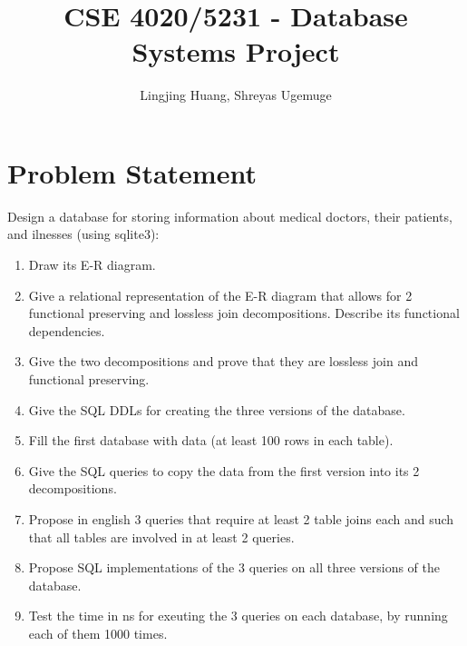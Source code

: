 \documentclass[12pt,arial]{article}
\title{CSE 4020/5231 - Database Systems Project}
\author{Lingjing Huang, Shreyas Ugemuge}
\begin{document}
\maketitle
\tableofcontents
\pagebreak
\section*{Problem Statement}
Design a database for storing information about medical doctors, their patients, and ilnesses (using sqlite3):
\begin{enumerate}
	\item Draw its E-R diagram.
	\item Give a relational representation of the E-R diagram that allows for 2 functional preserving and lossless join decompositions. Describe its functional dependencies.
	\item Give the two decompositions and prove that they are lossless join and functional preserving.
	\item Give the SQL DDLs for creating the three versions of the database.
	\item Fill the first database with data (at least 100 rows in each table).
	\item Give the SQL queries to copy the data from the first version into its 2 decompositions.
	\item Propose in english 3 queries that require at least 2 table joins each and such that all tables are involved in at least 2 queries.
	\item Propose SQL implementations of the 3 queries on all three versions of the database.
	\item Test the time in ns for exeuting the 3 queries on each database, by running each of them 1000 times.
\end{enumerate}
\pagebreak
\end{document}
